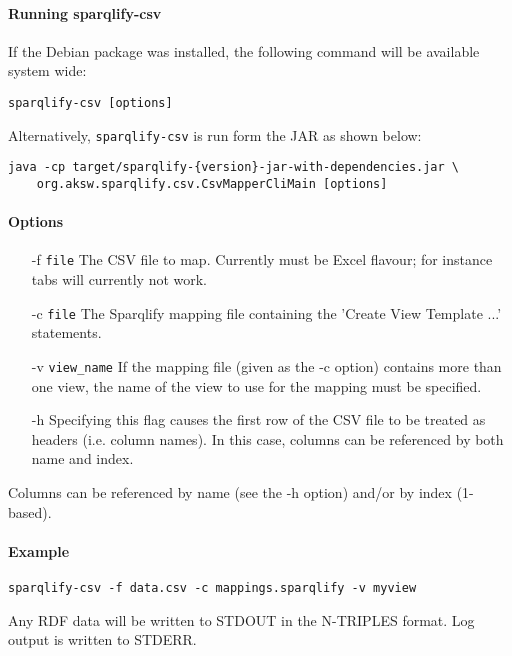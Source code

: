 \documentclass[a4paper,twoside,bibtotoc,abstracton,12pt,BCOR=15mm]{scrreprt}
\begin{document}
\paragraph{Running sparqlify-csv}
If the Debian package was installed, the following command will be available system wide:
\begin{lstlisting}
sparqlify-csv [options]
\end{lstlisting}

Alternatively, \texttt{sparqlify-csv} is run form the JAR as shown below:
\begin{lstlisting}
java -cp target/sparqlify-{version}-jar-with-dependencies.jar \
    org.aksw.sparqlify.csv.CsvMapperCliMain [options]
\end{lstlisting}

\paragraph{Options}
\begin{itemize}
  \item[-f] \texttt{file} The CSV file to map. Currently must be Excel flavour; for instance tabs will currently not work.
  \item[-c] \texttt{file} The Sparqlify mapping file containing the 'Create View Template ...' statements.
  \item[-v] \texttt{view\_name} If the mapping file (given as the -c option) contains more than one view, the name of the view to use for the mapping must be specified.
  \item[-h] Specifying this flag causes the first row of the CSV file to be treated as headers (i.e. column names). In this case, columns can be referenced by both name and index.
\end{itemize}

Columns can be referenced by name (see the -h option) and/or by index (1-based).

\paragraph{Example}
\begin{lstlisting}[caption=Example Invocation of the sparqlify-csv tool]
sparqlify-csv -f data.csv -c mappings.sparqlify -v myview
\end{lstlisting}

Any RDF data will be written to STDOUT in the N-TRIPLES format. Log output is written to STDERR.
\end{document}
